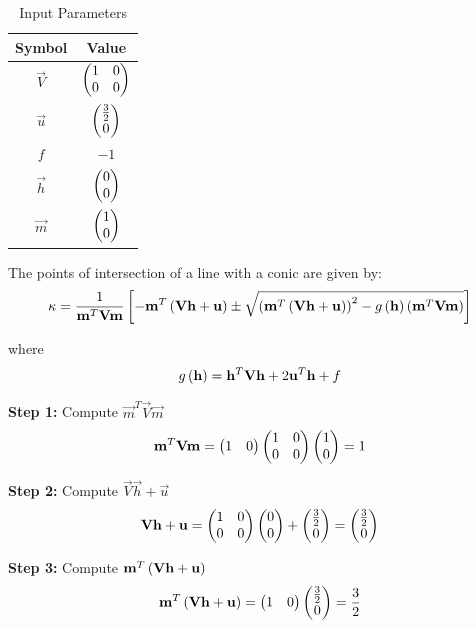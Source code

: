 \documentclass[journal]{IEEEtran}
\begin{document}
\begin{table}[H]
\centering
\begin{tabular}{|c|c|}
\hline
\textbf{Symbol} & \textbf{Value} \\
\hline
$\vec{V}$ & $\begin{pmatrix}1 & 0 \\ 0 & 0\end{pmatrix}$ \\
\hline
$\vec{u}$ & $\begin{pmatrix}\frac{3}{2} \\ 0\end{pmatrix}$ \\
\hline
$f$ & $-1$ \\
\hline
$\vec{h}$ & $\begin{pmatrix}0 \\ 0\end{pmatrix}$ \\
\hline
$\vec{m}$ & $\begin{pmatrix}1 \\ 0\end{pmatrix}$ \\
\hline
\end{tabular}
\caption{Input Parameters}
\label{tab:input}
\end{table}

The points of intersection of a line with a conic are given by:
\begin{align}
\kappa = \frac{1}{\mathbf{m}^T\mathbf{V}\mathbf{m}} {}\left[-\mathbf{m}^T\left(\mathbf{V}\mathbf{h} + \mathbf{u}\right) \pm \sqrt{\left(\mathbf{m}^T\left(\mathbf{V}\mathbf{h} + \mathbf{u}\right)\right)^2 - g\left(\mathbf{h}\right)\left(\mathbf{m}^T\mathbf{V}\mathbf{m}\right)}\right]
\end{align}

where
\begin{align}
g\left(\mathbf{h}\right) = \mathbf{h}^T\mathbf{V}\mathbf{h} + 2\mathbf{u}^T\mathbf{h} + f
\end{align}

\textbf{Step 1:} Compute $\vec{m}^T\vec{V}\vec{m}$
\begin{align}
\mathbf{m}^T\mathbf{V}\mathbf{m} = \begin{pmatrix}1 & 0\end{pmatrix}\begin{pmatrix}1 & 0 \\ 0 & 0\end{pmatrix}\begin{pmatrix}1 \\ 0\end{pmatrix} = 1
\end{align}

\textbf{Step 2:} Compute $\vec{V}\vec{h} + \vec{u}$
\begin{align}
\mathbf{V}\mathbf{h} + \mathbf{u} = \begin{pmatrix}1 & 0 \\ 0 & 0\end{pmatrix}\begin{pmatrix}0 \\ 0\end{pmatrix} + \begin{pmatrix}\frac{3}{2} \\ 0\end{pmatrix} = \begin{pmatrix}\frac{3}{2} \\ 0\end{pmatrix}
\end{align}

\textbf{Step 3:} Compute $\mathbf{m}^T\left(\mathbf{V}\mathbf{h} + \mathbf{u}\right)$
\begin{align}
\mathbf{m}^T\left(\mathbf{V}\mathbf{h} + \mathbf{u}\right) = \begin{pmatrix}1 & 0\end{pmatrix}\begin{pmatrix}\frac{3}{2} \\ 0\end{pmatrix} = \frac{3}{2}
\end{align}
\end{document}
